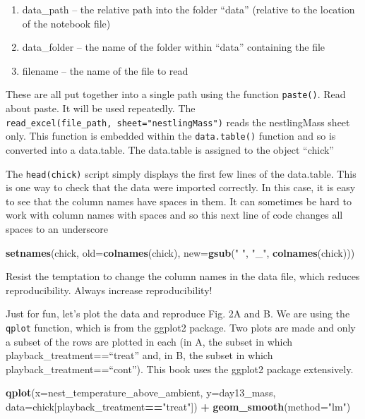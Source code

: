 \documentclass[]{book}
\newenvironment{Shaded}{\begin{snugshade}}{\end{snugshade}}
\newcommand{\KeywordTok}[1]{\textcolor[rgb]{0.13,0.29,0.53}{\textbf{#1}}}
\newcommand{\DataTypeTok}[1]{\textcolor[rgb]{0.13,0.29,0.53}{#1}}
\newcommand{\StringTok}[1]{\textcolor[rgb]{0.31,0.60,0.02}{#1}}
\newcommand{\OperatorTok}[1]{\textcolor[rgb]{0.81,0.36,0.00}{\textbf{#1}}}
\newcommand{\NormalTok}[1]{#1}
\providecommand{\tightlist}{%
  \setlength{\itemsep}{0pt}\setlength{\parskip}{0pt}}
\begin{document}
\begin{enumerate}
\def\labelenumi{\arabic{enumi}.}
\tightlist
\item
  data\_path -- the relative path into the folder ``data'' (relative to
  the location of the notebook file)
\item
  data\_folder -- the name of the folder within ``data'' containing the
  file
\item
  filename -- the name of the file to read
\end{enumerate}

These are all put together into a single path using the function
\texttt{paste()}. Read about paste. It will be used repeatedly. The
\texttt{read\_excel(file\_path,\ sheet="nestlingMass")} reads the
nestlingMass sheet only. This function is embedded within the
\texttt{data.table()} function and so is converted into a data.table.
The data.table is assigned to the object ``chick''

The \texttt{head(chick)} script simply displays the first few lines of
the data.table. This is one way to check that the data were imported
correctly. In this case, it is easy to see that the column names have
spaces in them. It can sometimes be hard to work with column names with
spaces and so this next line of code changes all spaces to an underscore

\begin{Shaded}
\begin{Highlighting}[]
\KeywordTok{setnames}\NormalTok{(chick, }\DataTypeTok{old=}\KeywordTok{colnames}\NormalTok{(chick), }\DataTypeTok{new=}\KeywordTok{gsub}\NormalTok{(}\StringTok{" "}\NormalTok{, }\StringTok{"_"}\NormalTok{, }\KeywordTok{colnames}\NormalTok{(chick)))}
\end{Highlighting}
\end{Shaded}

Resist the temptation to change the column names in the data file, which
reduces reproducibility. Always increase reproducibility!

Just for fun, let's plot the data and reproduce Fig. 2A and B. We are
using the \texttt{qplot} function, which is from the ggplot2 package.
Two plots are made and only a subset of the rows are plotted in each (in
A, the subset in which playback\_treatment==``treat'' and, in B, the
subset in which playback\_treatment==``cont''). This book uses the
ggplot2 package extensively.

\begin{Shaded}
\begin{Highlighting}[]
\KeywordTok{qplot}\NormalTok{(}\DataTypeTok{x=}\NormalTok{nest_temperature_above_ambient, }\DataTypeTok{y=}\NormalTok{day13_mass, }\DataTypeTok{data=}\NormalTok{chick[playback_treatment}\OperatorTok{==}\StringTok{"treat"}\NormalTok{]) }\OperatorTok{+}
\StringTok{  }\KeywordTok{geom_smooth}\NormalTok{(}\DataTypeTok{method=}\StringTok{"lm"}\NormalTok{)}
\end{Highlighting}
\end{Shaded}
\end{document}
